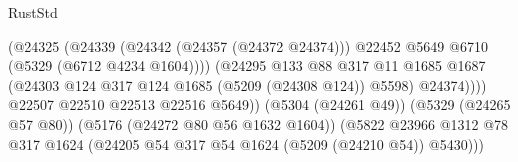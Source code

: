 \begin{lexlean}{RustStd}
\begin{coremodule}
                                                      (@24325
                                                        (@24339
                                                          (@24342 (@24357 (@24372 @24374)))
                                                          @22452
                                                          @5649
                                                          @6710
                                                          (@5329 (@6712 @4234 @1604))))
                                                      (@24295
                                                        @133
                                                        @88
                                                        @317
                                                        @11
                                                        @1685
                                                        @1687
                                                        (@24303
                                                          @124
                                                          @317
                                                          @124
                                                          @1685
                                                          (@5209 (@24308 @124))
                                                          @5598)
                                                        @24374))))
                                                @22507
                                                @22510
                                                @22513
                                                @22516
                                                @5649))
                                            (@5304 (@24261 @49))
                                            (@5329 (@24265 @57 @80))
                                            (@5176 (@24272 @80 @56 @1632 @1604))
                                            (@5822
                                              @23966
                                              @1312
                                              @78
                                              @317
                                              @1624
                                              (@24205
                                                @54
                                                @317
                                                @54
                                                @1624
                                                (@5209 (@24210 @54))
                                                @5430)))

\end{coremodule}
\end{lexlean}
